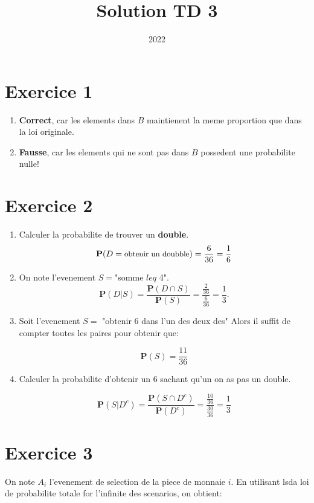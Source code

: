 \documentclass[a4paper]{tufte-handout}
\title{Solution TD 3}
\date{2022}
\begin{document}
\maketitle

\renewcommand{\P}{\mathbf{P}}

\section{Exercice 1}

\begin{enumerate}
  \item \textbf{Correct}, car les elements dans $B$ maintienent la meme
    proportion que dans la loi originale.\\
  \item \textbf{Fausse}, car les elements qui ne sont pas dans $B$ possedent une
    probabilite nulle!
\end{enumerate}

\section{Exercice 2}
\begin{enumerate}
  \item Calculer la probabilite de trouver un \textbf{double}.
    $$
    \P(D=\text{\small obtenir un doubble}) = \frac{6}{36} = \frac{1}{6}
    $$
  \item  On note l'evenement $S=$"somme $leq$ 4".
    $$
    \P(D | S) = \frac{\P(D\cap S)}{\P(S)} = \frac{\frac{2}{36}}{\frac{6}{36}}=
    \frac{1}{3}.
    $$
  \item Soit l'evenement $S=$ "{\small obtenir 6 dans l'un des deux des}"
    Alors il suffit de compter toutes les paires pour obtenir que:

    $$
    \P(S) = \frac{11}{36}
    $$
  \item Calculer la probabilite d'obtenir un $6$ sachant qu'un on as pas un
    double.

    $$
    \P(S | D^c) = \frac{\P(S \cap D^c)}{\P(D^c)} =
    \frac{\frac{10}{36}}{\frac{30}{36}} = \frac{1}{3}
    $$
\end{enumerate}
\section{Exercice 3}
On note $A_i$ l'evenement de selection de la piece de monnaie $i$. En utilisant
lsda loi de probabilite totale for l'infinite des scenarios, on obtient:
\end{document}
